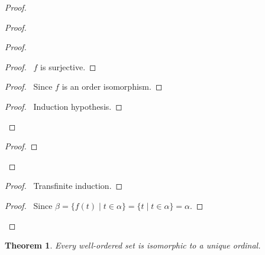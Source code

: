 \documentclass{book}
\let\qed\relax
\newtheorem{thm}[ax]{Theorem}
\theoremstyle{definition}
\begin{document}
\begin{proof}
\pf
{}
\begin{proof}
	\begin{proof}
		\begin{proof}
			\pf\ $f$ is surjective.
		\end{proof}
		\begin{proof}
			\pf\ Since $f$ is an order isomorphism.
		\end{proof}
		\begin{proof}
			\pf\ Induction hypothesis.
		\end{proof}
	\end{proof}
	\begin{proof}
	\end{proof}
\end{proof}
\begin{proof}
	\pf\ Transfinite induction.
\end{proof}
\begin{proof}
	\pf\ Since $\beta = \{ f(t) \mid t \in \alpha \} = \{ t \mid t \in \alpha \} = \alpha$.
\end{proof}
\qed
\end{proof}

\begin{thm}
Every well-ordered set is isomorphic to a unique ordinal.
\end{thm}
\end{document}
